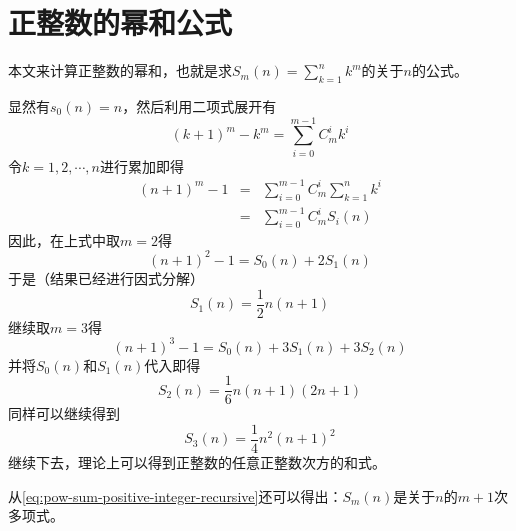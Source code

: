 
\section{正整数的幂和公式}
\label{sec:power-sum-for-positive-integer}

本文来计算正整数的幂和，也就是求$S_m(n) = \sum_{k=1}^nk^m$的关于$n$的公式。

显然有$s_0(n)=n$，然后利用二项式展开有
\[ (k+1)^{m}-k^{m} = \sum_{i=0}^{m-1}C_{m}^{i}k^i \]
令$k=1,2,\cdots,n$进行累加即得
\begin{eqnarray}
  \label{eq:pow-sum-positive-integer-recursive}
(n+1)^{m}-1 & = & \sum_{i=0}^{m-1}C_{m}^{i}\sum_{k=1}^{n}k^i \\
             & = & \sum_{i=0}^{m-1}C_{m}^{i}S_i(n)
\end{eqnarray}
因此，在上式中取$m=2$得
\[ (n+1)^2-1 = S_0(n)+2S_1(n) \]
于是（结果已经进行因式分解）
\[ S_1(n)=\frac{1}{2}n(n+1) \]
继续取$m=3$得
\[ (n+1)^3-1=S_0(n)+3S_1(n)+3S_2(n) \]
并将$S_0(n)$和$S_1(n)$代入即得
\[ S_2(n) = \frac{1}{6}n(n+1)(2n+1) \]
同样可以继续得到
\[ S_3(n)=\frac{1}{4}n^2(n+1)^2 \]
继续下去，理论上可以得到正整数的任意正整数次方的和式。

从\ref{eq:pow-sum-positive-integer-recursive}还可以得出：$S_m(n)$是关于$n$的$m+1$次多项式。